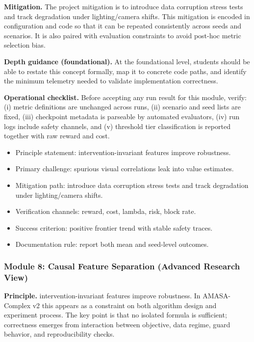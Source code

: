 \documentclass[conference]{IEEEtran}
\begin{document}
\textbf{Mitigation.} The project mitigation is to introduce data corruption stress tests and track degradation under lighting/camera shifts. This mitigation is encoded in configuration and code so that it can be repeated consistently across seeds and scenarios. It is also paired with evaluation constraints to avoid post-hoc metric selection bias.

\textbf{Depth guidance (foundational).} At the foundational level, students should be able to restate this concept formally, map it to concrete code paths, and identify the minimum telemetry needed to validate implementation correctness.

\textbf{Operational checklist.} Before accepting any run result for this module, verify: (i) metric definitions are unchanged across runs, (ii) scenario and seed lists are fixed, (iii) checkpoint metadata is parseable by automated evaluators, (iv) run logs include safety channels, and (v) threshold tier classification is reported together with raw reward and cost.

\begin{itemize}[leftmargin=*]
  \item Principle statement: intervention-invariant features improve robustness.
  \item Primary challenge: spurious visual correlations leak into value estimates.
  \item Mitigation path: introduce data corruption stress tests and track degradation under lighting/camera shifts.
  \item Verification channels: reward, cost, lambda, risk, block rate.
  \item Success criterion: positive frontier trend with stable safety traces.
  \item Documentation rule: report both mean and seed-level outcomes.
\end{itemize}


\subsubsection{Module 8: Causal Feature Separation (Advanced Research View)}
\textbf{Principle.} intervention-invariant features improve robustness. In AMASA-Complex v2 this appears as a constraint on both algorithm design and experiment process. The key point is that no isolated formula is sufficient; correctness emerges from interaction between objective, data regime, guard behavior, and reproducibility checks.
\end{document}
